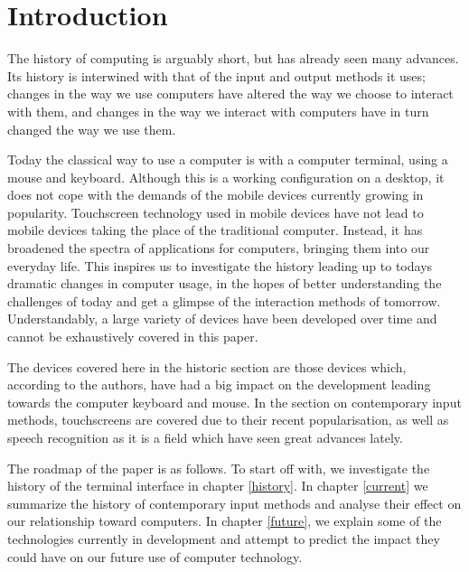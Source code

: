 
\section{Introduction}

The history of computing is arguably short, but has already seen many advances. Its history is interwined with that of the input and output methods it uses; changes in the way we use computers have altered the way we choose to interact with them, and changes in the way we interact with computers have in turn changed the way we use them.

Today the classical way to use a computer is with a computer terminal, using a mouse and keyboard. Although this is a working configuration on a desktop, it does not cope with the demands of the mobile devices currently growing in popularity. Touchscreen technology used in mobile devices have not lead to mobile devices taking the place of the traditional computer. Instead, it has broadened the spectra of applications for computers, bringing them into our everyday life. This inspires us to investigate the history leading up to todays dramatic changes in computer usage, in the hopes of better understanding the challenges of today and get a glimpse of the interaction methods of tomorrow. Understandably, a large variety of devices have been developed over time and cannot be exhaustively covered in this paper.

The devices covered here in the historic section are those devices which, according to the authors, have had a big impact on the development leading towards the computer keyboard and mouse. In the section on contemporary input methods, touchscreens are covered due to their recent popularisation, as well as speech recognition as it is a field which have seen great advances lately. 


The roadmap of the paper is as follows. To start off with, we investigate the history of the terminal interface in chapter \ref{history}. In chapter \ref{current} we summarize the history of contemporary input methods and analyse their effect on our relationship toward computers. In chapter \ref{future}, we explain some of the technologies currently in development and attempt to predict the impact they could have on our future use of computer technology.
